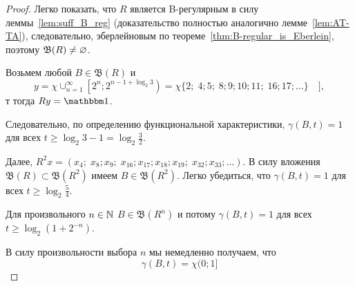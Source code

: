 \begin{proof}
	Легко показать, что $R$ является B-регулярным
	в силу леммы~\ref{lem:suff_B_reg} (доказательство полностью аналогично лемме~\ref{lem:AT-TA}),
    следовательно, эберлейновым по теореме~\ref{thm:B-regular_is_Eberlein},
    поэтому $\mathfrak{B}(R)\ne \varnothing$.

    Возьмем любой $B \in \mathfrak{B}(R)$ и
    \begin{equation}
        y = \chi \cup_{n=1}^\infty \left[ 2^n; 2^{n-1+\log_2 3}\right) =
        \chi \{ 2; \; 4;5; \; 8;9;10;11; \; 16;17;... \}\quad]
        ,
    \end{equation}
    т тогда $Ry=\one$.

	Следовательно, по определению функциональной характеристики,
	$\gamma(B,t) = 1$ для всех $t \geq \log_2 3 - 1 = \log_2 \frac32$.

	Далее, $R^2 x = (x_4; \; x_8; x_9;\; x_{16}; x_{17}; x_{18}; x_{19}; \; x_{32}; x_{33};...)$.
	В силу вложения $\mathfrak{B}(R)\subset\mathfrak{B}(R^2)$
	имеем $B\in\mathfrak{B}(R^2)$.
	Легко убедиться, что $\gamma(B,t) = 1$ для всех $t \geq \log_2 \frac54$.

	Для произвольного $n\in\mathbb{N}$ $B\in\mathfrak{B}(R^n)$
	и потому
	$\gamma(B,t) = 1$ для всех $t \geq \log_2 (1+2^{-n})$.

	В силу произвольности выбора $n$ мы немедленно получаем, что
	\begin{equation}
		\label{eq:gamma_chi_0_1}
		\gamma(B,t) = \chi{(}0;1{]}
	\end{equation}



\end{proof}
